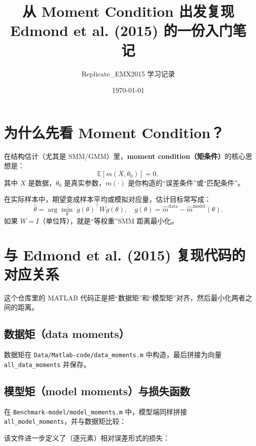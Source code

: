 \documentclass[12pt]{article}
\title{从 Moment Condition 出发复现\\\small Edmond et al. (2015) 的一份入门笔记}
\author{Replicate\_EMX2015 学习记录}
\date{\today}
\begin{document}
\maketitle

\section{为什么先看 Moment Condition？}
在结构估计（尤其是 SMM/GMM）里，\textbf{moment condition（矩条件）}的核心思想是：
\begin{equation}
\mathbb{E}[m(X,\theta_0)] = 0,
\end{equation}
其中 $X$ 是数据，$\theta_0$ 是真实参数，$m(\cdot)$ 是你构造的“误差条件”或“匹配条件”。

在实际样本中，期望变成样本平均或模拟对应量，估计目标常写成：
\begin{equation}
\hat\theta = \arg\min_{\theta}\; g(\theta)^\top W g(\theta),
\quad g(\theta)=\hat m^{\text{data}}-\hat m^{\text{model}}(\theta).
\end{equation}
如果 $W=I$（单位阵），就是“等权重”SMM 距离最小化。

\section{与 Edmond et al. (2015) 复现代码的对应关系}
这个仓库里的 MATLAB 代码正是把“数据矩”和“模型矩”对齐，然后最小化两者之间的距离。

\subsection{数据矩（data moments）}
数据矩在 \texttt{Data/Matlab-code/data\_moments.m} 中构造，最后拼接为向量 \texttt{all\_data\_moments} 并保存。



\subsection{模型矩（model moments）与损失函数}
在 \texttt{Benchmark-model/model\_moments.m} 中，模型端同样拼接 \texttt{all\_model\_moments}，并与数据矩比较：



该文件进一步定义了（逐元素）相对误差形式的损失：
\end{document}
